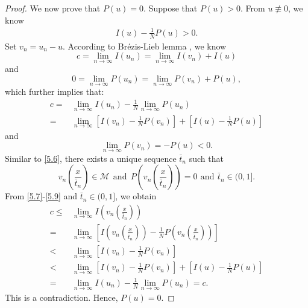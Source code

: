 \documentclass[12pt,a4paper,reqno]{amsart}
\numberwithin{equation}{section}
\begin{document}
\begin{proof}
We now prove that
$P(u)=0$.
Suppose that
$P(u)>0$.
From
$u\not\equiv0$,
we know
\begin{equation}\label{5.7}
\begin{aligned}
I(u)
-
\frac{1}{N}
P(u)>0.
\end{aligned}
\end{equation}
Set $v_{n}=u_{n}-u$.
According to Br\'{e}zis-Lieb lemma
\cite{Brezis-Lieb1983PAMS},
we know
\begin{equation*}
c
=
\lim_{n\rightarrow\infty} I(u_{n})=\lim_{n\rightarrow\infty} I(v_{n})+I(u)
\end{equation*}
and
\begin{equation*}
0=\lim_{n\rightarrow\infty}P(u_{n})=\lim_{n\rightarrow\infty}P(v_{n})+P(u),
\end{equation*}
which further implies that:
\begin{equation}\label{5.8}
\begin{aligned}
c=&
\lim_{n\rightarrow\infty}
I(u_{n})-
\frac{1}{N}
\lim_{n\rightarrow\infty}P(u_{n})\\
=&
\lim_{n\rightarrow\infty}
\left[
I(v_{n})
-
\frac{1}{N}
P(v_{n})
\right]
+
\left[
I(u)-\frac{1}{N}P(u)
\right]
\end{aligned}
\end{equation}
and
\begin{equation*}
\lim_{n\rightarrow\infty}
P(v_{n})=-P(u)<0.
\end{equation*}
Similar to \eqref{5.6}, there exists a unique sequence $\bar{t}_{n}$ such that
\begin{equation}\label{5.9}
v_{n}\left(\frac{x}{\bar{t}_{n}}\right)\in \mathcal{M}
~~\mathrm{and}~~
P\left(v_{n}\left(\frac{x}{\bar{t}_{n}}\right)\right)=0
\ \,
\mathrm{and}
\ \,
\bar{t}_{n}\in(0,1].
\end{equation}
From
\eqref{5.7}-\eqref{5.9} and $\bar{t}_{n}\in(0,1]$,
we obtain
\begin{equation*}
\begin{aligned}
c
\leqslant&
\lim_{n\rightarrow\infty}
I\left(v_{n}\left(\frac{x}{\bar{t}_{n}}\right)\right)\\
=&
\lim_{n\rightarrow\infty}
\left[
I\left(v_{n}\left(\frac{x}{\bar{t}_{n}}\right)\right)
-
\frac{1}{N}
P\left(v_{n}\left(\frac{x}{\bar{t}_{n}}\right)\right)
\right]\\
<&
\lim_{n\rightarrow\infty}
\left[
I(v_{n})
-
\frac{1}{N}
P(v_{n})
\right]\\
<&
\lim_{n\rightarrow\infty}
\left[
I(v_{n})
-
\frac{1}{N}
P(v_{n})
\right]
+
\left[
I(u)-\frac{1}{N}P(u)
\right]\\
=&
\lim_{n\rightarrow\infty}
I(u_{n})
-
\frac{1}{N}
\lim_{n\rightarrow\infty}
P(u_{n})
=
c.
\end{aligned}
\end{equation*}
This is a contradiction. Hence, $P(u)=0$.


\end{proof}
\end{document}
